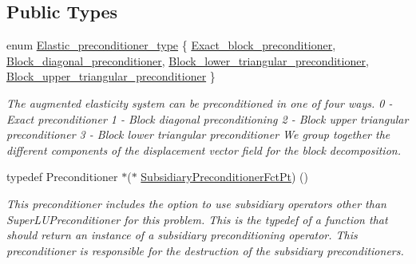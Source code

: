 \subsection*{Public Types}
\begin{DoxyCompactItemize}
\item 
enum \hyperlink{classoomph_1_1PseudoElasticPreconditioner_acde733e1a111a961d1e714add4e8015d}{Elastic\+\_\+preconditioner\+\_\+type} \{ \hyperlink{classoomph_1_1PseudoElasticPreconditioner_acde733e1a111a961d1e714add4e8015da277774b20738300271de0fa42391a951}{Exact\+\_\+block\+\_\+preconditioner}, 
\hyperlink{classoomph_1_1PseudoElasticPreconditioner_acde733e1a111a961d1e714add4e8015da048620d7667a53bcfb11513dea9b2977}{Block\+\_\+diagonal\+\_\+preconditioner}, 
\hyperlink{classoomph_1_1PseudoElasticPreconditioner_acde733e1a111a961d1e714add4e8015dabf00157409786d29ec7122bb86a5e8fe}{Block\+\_\+lower\+\_\+triangular\+\_\+preconditioner}, 
\hyperlink{classoomph_1_1PseudoElasticPreconditioner_acde733e1a111a961d1e714add4e8015daed4f4716017bc0f8d0c40ed7aaab735e}{Block\+\_\+upper\+\_\+triangular\+\_\+preconditioner}
 \}\begin{DoxyCompactList}\small\item\em The augmented elasticity system can be preconditioned in one of four ways. 0 -\/ Exact preconditioner 1 -\/ Block diagonal preconditioning 2 -\/ Block upper triangular preconditioner 3 -\/ Block lower triangular preconditioner We group together the different components of the displacement vector field for the block decomposition. \end{DoxyCompactList}
\item 
typedef Preconditioner $\ast$($\ast$ \hyperlink{classoomph_1_1PseudoElasticPreconditioner_a1462e1ef48ed2668c06dfd36c783d1a5}{Subsidiary\+Preconditioner\+Fct\+Pt}) ()
\begin{DoxyCompactList}\small\item\em This preconditioner includes the option to use subsidiary operators other than Super\+L\+U\+Preconditioner for this problem. This is the typedef of a function that should return an instance of a subsidiary preconditioning operator. This preconditioner is responsible for the destruction of the subsidiary preconditioners. \end{DoxyCompactList}\end{DoxyCompactItemize}
